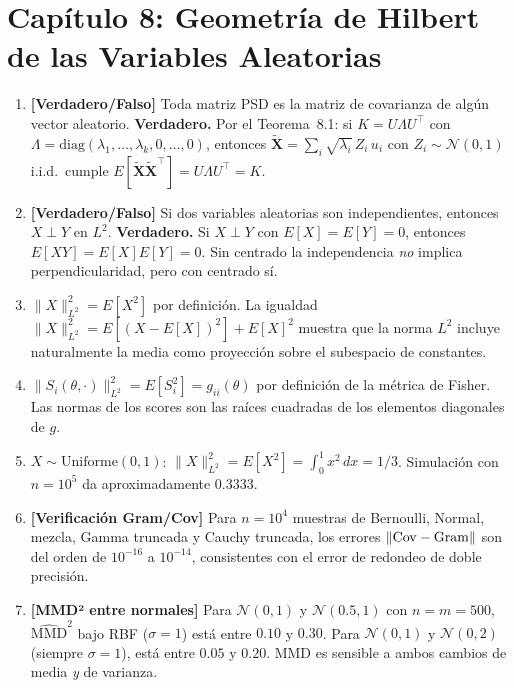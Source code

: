 \section*{Capítulo 8: Geometría de Hilbert de las Variables Aleatorias}

\begin{enumerate}
	\item \textbf{[Verdadero/Falso]} Toda matriz PSD es la matriz de covarianza de algún vector aleatorio. \textbf{Verdadero.} Por el Teorema~8.1: si $K = U\Lambda U^\top$ con $\Lambda = \mathrm{diag}(\lambda_1,\dots,\lambda_k,0,\dots,0)$, entonces $\widetilde{\mathbf{X}} = \sum_i \sqrt{\lambda_i}\,Z_i\,u_i$ con $Z_i\sim\mathcal{N}(0,1)$ i.i.d.\ cumple $E[\widetilde{\mathbf{X}}\widetilde{\mathbf{X}}^\top] = U\Lambda U^\top = K$.

	\item \textbf{[Verdadero/Falso]} Si dos variables aleatorias son independientes, entonces $X\perp Y$ en $L^2$. \textbf{Verdadero.} Si $X\perp Y$ con $E[X]=E[Y]=0$, entonces $E[XY]=E[X]E[Y]=0$. Sin centrado la independencia \emph{no} implica perpendicularidad, pero con centrado sí.

	\item $\|X\|_{L^2}^2 = E[X^2]$ por definición. La igualdad $\|X\|_{L^2}^2 = E[(X-E[X])^2] + E[X]^2$ muestra que la norma $L^2$ incluye naturalmente la media como proyección sobre el subespacio de constantes.

	\item $\|S_i(\theta,\cdot)\|_{L^2}^2 = E[S_i^2] = g_{ii}(\theta)$ por definición de la métrica de Fisher. Las normas de los scores son las raíces cuadradas de los elementos diagonales de $g$.

	\item $X\sim\mathrm{Uniforme}(0,1)$: $\|X\|_{L^2}^2 = E[X^2] = \int_0^1 x^2\,dx = 1/3$. Simulación con $n=10^5$ da aproximadamente $0.3333$.

	\item \textbf{[Verificación Gram/Cov]} Para $n=10^4$ muestras de Bernoulli, Normal, mezcla, Gamma truncada y Cauchy truncada, los errores $\|{\rm Cov} - {\rm Gram}\|$ son del orden de $10^{-16}$ a $10^{-14}$, consistentes con el error de redondeo de doble precisión.

	\item \textbf{[MMD² entre normales]} Para $\mathcal{N}(0,1)$ y $\mathcal{N}(0.5,1)$ con $n=m=500$, $\widehat{\mathrm{MMD}}^2$ bajo RBF ($\sigma=1$) está entre $0.10$ y $0.30$. Para $\mathcal{N}(0,1)$ y $\mathcal{N}(0,2)$ (siempre $\sigma=1$), está entre $0.05$ y $0.20$. MMD es sensible a ambos cambios de media \emph{y} de varianza.


\end{enumerate}
